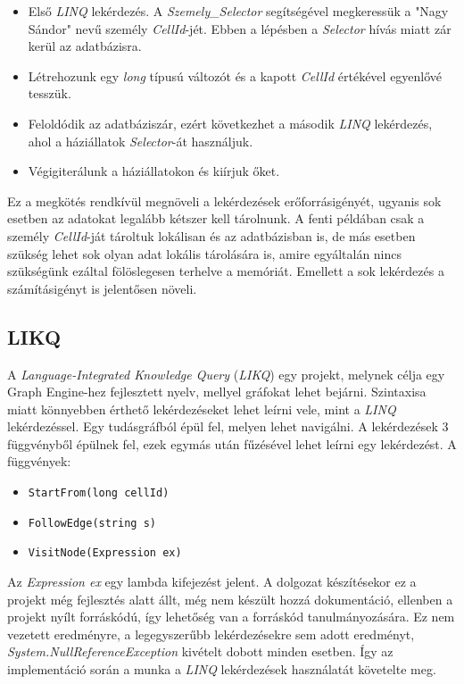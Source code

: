 \begin{itemize}
	\item Első \emph{LINQ} lekérdezés. A \emph{Szemely\_Selector} segítségével megkeressük a "Nagy Sándor" nevű személy \emph{CellId}-jét. Ebben a lépésben a \emph{Selector} hívás miatt zár kerül az adatbázisra.
	\item Létrehozunk egy \emph{long} típusú változót és a kapott \emph{CellId} értékével egyenlővé tesszük.
	\item Feloldódik az adatbáziszár, ezért következhet a második \emph{LINQ} lekérdezés, ahol a háziállatok \emph{Selector}-át használjuk.
	\item Végigiterálunk a háziállatokon és kiírjuk őket.
\end{itemize}

Ez a megkötés rendkívül megnöveli a lekérdezések erőforrásigényét, ugyanis sok esetben az adatokat legalább kétszer kell tárolnunk. A fenti példában csak a személy \emph{CellId}-ját tároltuk lokálisan és az adatbázisban is, de más esetben szükség lehet sok olyan adat lokális tárolására is, amire egyáltalán nincs szükségünk ezáltal fölöslegesen terhelve a memóriát. Emellett a sok lekérdezés a számításigényt is jelentősen növeli.

\subsection{LIKQ}

A \emph{Language-Integrated Knowledge Query} (\emph{LIKQ}) egy projekt, melynek célja egy Graph Engine-hez fejlesztett nyelv, mellyel gráfokat lehet bejárni. Szintaxisa miatt könnyebben érthető lekérdezéseket lehet leírni vele, mint a \emph{LINQ} lekérdezéssel. Egy tudásgráfból épül fel, melyen lehet navigálni. A lekérdezések 3 függvényből épülnek fel, ezek egymás után fűzésével lehet leírni egy lekérdezést. A függvények:

\begin{itemize}
	\item \texttt{StartFrom(long cellId)}
	\item \texttt{FollowEdge(string s)}
	\item \texttt{VisitNode(Expression ex)}
\end{itemize}

Az \emph{Expression ex} egy lambda kifejezést jelent. A dolgozat készítésekor ez a projekt még fejlesztés alatt állt, még nem készült hozzá dokumentáció, ellenben a projekt nyílt forráskódú, így lehetőség van a forráskód tanulmányozására. Ez nem vezetett eredményre, a legegyszerűbb lekérdezésekre sem adott eredményt, \emph{System.NullReferenceException} kivételt dobott minden esetben. Így az implementáció során a munka a \emph{LINQ} lekérdezések használatát követelte meg.